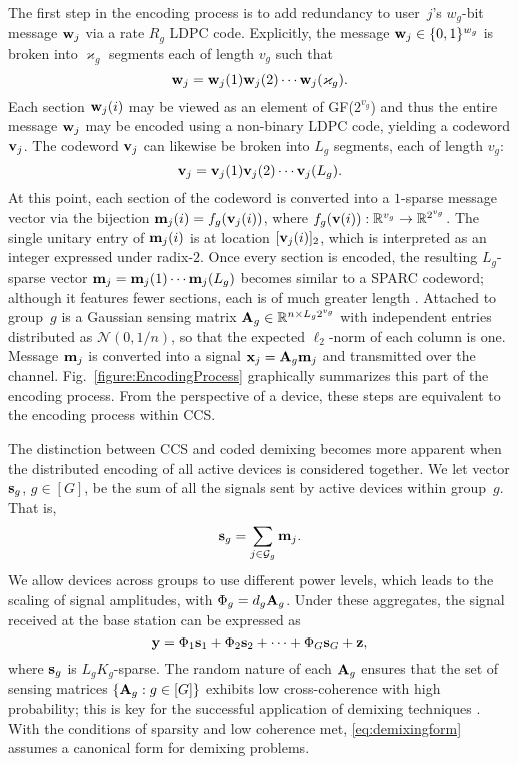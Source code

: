 \documentclass[journal]{IEEEtran}
\begin{document}
The first step in the encoding process is to add redundancy to user~$j$'s $w_g$-bit message $\mathbf{w}_j$ via a rate $R_g$ LDPC code.
Explicitly, the message $\mathbf{w}_j \in \{0, 1\}^{w_g}$ is broken into $\varkappa_g$ segments each of length $v_g$ such that
\begin{equation*}
    \mathbf{w}_j = \mathbf{w}_j(1)\mathbf{w}_j(2)\cdots\mathbf{w}_j(\varkappa_g).
\end{equation*}
Each section $\mathbf{w}_j(i)$ may be viewed as an element of GF($2^{v_g}$) and thus the entire message $\mathbf{w}_j$ may be encoded using a non-binary LDPC code, yielding a codeword $\mathbf{v}_j$. 
The codeword $\mathbf{v}_j$ can likewise be broken into $L_g$ segments, each of length $v_g$:
\begin{equation} \label{equation:codeword}
    \mathbf{v}_j = \mathbf{v}_j(1)\mathbf{v}_j(2)\cdots\mathbf{v}_j(L_g) .
\end{equation}
At this point, each section of the codeword is converted into a $1$-sparse message vector via the bijection $\mathbf{m}_j(i) = f_g(\mathbf{v}_j(i))$, where $f_g(\mathbf{v}(i)): \mathbb{R}^{v_g} \rightarrow \mathbb{R}^{2^{v_g}}$. 
The single unitary entry of $\mathbf{m}_j(i)$ is at location $[\mathbf{v}_j(i)]_2$, which is interpreted as an integer expressed under radix-$2$.
Once every section is encoded, the resulting $L_g$-sparse vector $\mathbf{m}_j = \mathbf{m}_j(1)\cdots\mathbf{m}_j(L_g)$ becomes similar to a SPARC codeword; although it features fewer sections, each is of much greater length \cite{fengler2019sparcs}.
Attached to group~$g$ is a Gaussian sensing matrix $\mathbf{A}_g \in \mathbb{R}^{n \times L_g 2^{v_g}}$ with independent entries distributed as $\mathcal{N}(0, {1}/{n})$, so that the expected $\ell_2$-norm of each column is one.
Message $\mathbf{m}_j$ is converted into a signal $\mathbf{x}_j = \mathbf{A}_g\mathbf{m}_j$ and transmitted over the channel.  
Fig.~\ref{figure:EncodingProcess} graphically summarizes this part of the encoding process.
From the perspective of a device, these steps are equivalent to the encoding process within CCS.

The distinction between CCS and coded demixing becomes more apparent when the distributed encoding of all active devices is considered together.
We let vector $\mathbf{s}_g$, $g \in [G]$, be the sum of all the signals sent by active devices within group~$g$.
That is, 
\begin{equation*}
    \mathbf{s}_g = \sum_{j \in \mathcal{G}_g} \mathbf{m}_j .
\end{equation*}
We allow devices across groups to use different power levels, which leads to the scaling of signal amplitudes, with $\Phi_g = d_g \mathbf{A}_g$.
Under these aggregates, the signal received at the base station can be expressed as
\begin{equation}
    \label{eq:demixingform}
    \mathbf{y} = \Phi_1\mathbf{s}_1 + \Phi_2\mathbf{s}_2 + \cdots + \Phi_G\mathbf{s}_G + \mathbf{z},
\end{equation}
where $\mathbf{s}_g$ is $L_g K_g$-sparse.
The random nature of each $\mathbf{A}_g$ ensures that the set of sensing matrices $\{\mathbf{A}_g : g\in[G]\}$ exhibits low cross-coherence with high probability; this is key for the successful application of demixing techniques \cite{mccoy2014sharp}. 
With the conditions of sparsity and low coherence met, \eqref{eq:demixingform} assumes a canonical form for demixing problems.
\end{document}
